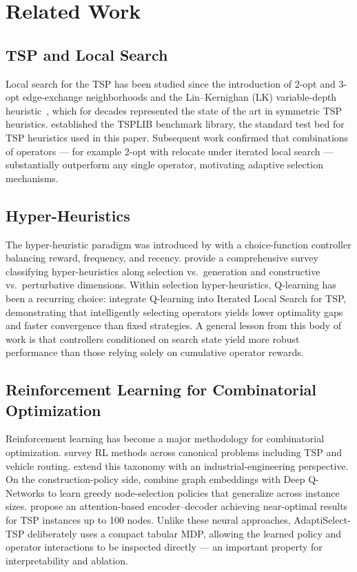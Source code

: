 \documentclass{article}
\begin{document}
\section{Related Work}

\subsection{TSP and Local Search}

Local search for the TSP has been studied since the introduction of 2-opt and
3-opt edge-exchange neighborhoods and the Lin--Kernighan (LK) variable-depth
heuristic~\citep{lin1973lk}, which for decades represented the state of the art
in symmetric TSP heuristics. \citet{reinelt1991tsplib} established the TSPLIB
benchmark library, the standard test bed for TSP heuristics used in this paper.
Subsequent work confirmed that combinations of operators --- for example 2-opt
with relocate under iterated local search --- substantially outperform any
single operator, motivating adaptive selection mechanisms.

\subsection{Hyper-Heuristics}

The hyper-heuristic paradigm was introduced by \citet{cowling2001hyper} with a
choice-function controller balancing reward, frequency, and recency.
\citet{burke2013hyper} provide a comprehensive survey classifying
hyper-heuristics along selection vs.\ generation and constructive vs.\
perturbative dimensions. Within selection hyper-heuristics, Q-learning has been
a recurring choice: \citet{karimim2021ils} integrate Q-learning into Iterated
Local Search for TSP, demonstrating that intelligently selecting operators yields
lower optimality gaps and faster convergence than fixed strategies. A general
lesson from this body of work is that controllers conditioned on search state
yield more robust performance than those relying solely on cumulative operator
rewards.

\subsection{Reinforcement Learning for Combinatorial Optimization}

Reinforcement learning has become a major methodology for combinatorial
optimization. \citet{mazyavkina2021rl} survey RL methods across canonical
problems including TSP and vehicle routing. \citet{chung2025neural} extend this
taxonomy with an industrial-engineering perspective. On the construction-policy
side, \citet{khalil2017learning} combine graph embeddings with Deep Q-Networks
to learn greedy node-selection policies that generalize across instance sizes.
\citet{kool2019attention} propose an attention-based encoder--decoder achieving
near-optimal results for TSP instances up to 100 nodes. Unlike these neural
approaches, AdaptiSelect-TSP deliberately uses a compact tabular MDP, allowing
the learned policy and operator interactions to be inspected directly --- an
important property for interpretability and ablation.
\end{document}
